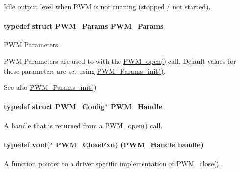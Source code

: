 Idle output level when P\+W\+M is not running (stopped / not started). 

\paragraph[{P\+W\+M\+\_\+\+Params}]{\setlength{\rightskip}{0pt plus 5cm}typedef struct {\bf P\+W\+M\+\_\+\+Params}  {\bf P\+W\+M\+\_\+\+Params}}\label{_p_w_m_8h_ac7349e4fc779fd744daf79b403269167}


P\+W\+M Parameters. 

P\+W\+M Parameters are used to with the \hyperlink{_p_w_m_8h_ac963beab0c5c6901bf852f175028aeaf}{P\+W\+M\+\_\+open()} call. Default values for these parameters are set using \hyperlink{_p_w_m_8h_acbdd3192f9f06bf689e4a3855926dcac}{P\+W\+M\+\_\+\+Params\+\_\+init()}.

\begin{DoxySeeAlso}{See also}
\hyperlink{_p_w_m_8h_acbdd3192f9f06bf689e4a3855926dcac}{P\+W\+M\+\_\+\+Params\+\_\+init()} 
\end{DoxySeeAlso}
\paragraph[{P\+W\+M\+\_\+\+Handle}]{\setlength{\rightskip}{0pt plus 5cm}typedef struct {\bf P\+W\+M\+\_\+\+Config}$\ast$ {\bf P\+W\+M\+\_\+\+Handle}}\label{_p_w_m_8h_afdefc765f42bbad4dca246fda6e1354b}


A handle that is returned from a \hyperlink{_p_w_m_8h_ac963beab0c5c6901bf852f175028aeaf}{P\+W\+M\+\_\+open()} call. 

\paragraph[{P\+W\+M\+\_\+\+Close\+Fxn}]{\setlength{\rightskip}{0pt plus 5cm}typedef void($\ast$ P\+W\+M\+\_\+\+Close\+Fxn) ({\bf P\+W\+M\+\_\+\+Handle} handle)}\label{_p_w_m_8h_a1643d365dfa900197b324ea74035d2ec}


A function pointer to a driver specific implementation of \hyperlink{_p_w_m_8h_a0e0f5899b067d27653db566fb148db11}{P\+W\+M\+\_\+close()}. 

